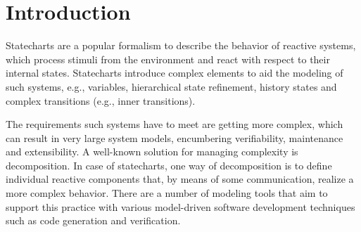 \begin{abstract}
\end{abstract}

%
\IEEEpeerreviewmaketitle

\section{Introduction}

Statecharts \cite{Harel:1987:SVF:34884.34886} are a popular formalism to describe the behavior of reactive systems, which process stimuli from the environment and react with respect to their internal states. Statecharts introduce complex elements to aid the modeling of such systems, e.g., variables, hierarchical state refinement, history states and complex transitions (e.g., inner transitions).

The requirements such systems have to meet are getting more complex, which can result in very large system models, encumbering verifiability, maintenance and extensibility. A well-known solution for managing complexity is decomposition. In case of statecharts, one way of decomposition is to define individual reactive components that, by means of some communication, realize a more complex behavior. There are a number of modeling tools that aim to support this practice with various model-driven software development techniques such as code generation and verification.

